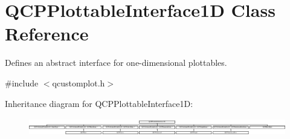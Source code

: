 \hypertarget{class_q_c_p_plottable_interface1_d}{}\section{Q\+C\+P\+Plottable\+Interface1D Class Reference}
\label{class_q_c_p_plottable_interface1_d}


Defines an abstract interface for one-\/dimensional plottables.  




{\ttfamily \#include $<$qcustomplot.\+h$>$}

Inheritance diagram for Q\+C\+P\+Plottable\+Interface1D\+:\begin{figure}[H]
\begin{center}
\leavevmode
\includegraphics[height=0.776699cm]{class_q_c_p_plottable_interface1_d}
\end{center}
\end{figure}
